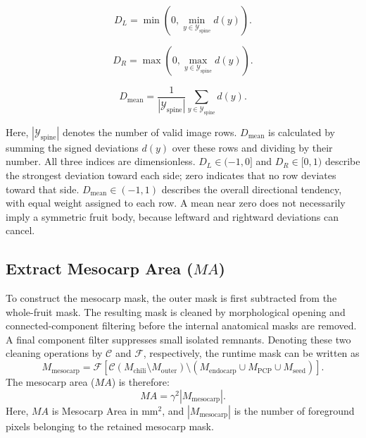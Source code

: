 \documentclass[final,5p,times,twocolumn]{elsarticle}
\begin{document}
\begin{equation}
D_L=\min\!\left(0,\min_{y\in\mathcal{Y}_{\mathrm{spine}}}d(y)\right).
\end{equation}

\begin{equation}
D_R=\max\!\left(0,\max_{y\in\mathcal{Y}_{\mathrm{spine}}}d(y)\right).
\end{equation}

\begin{equation}
D_{\mathrm{mean}}=\frac{1}{|\mathcal{Y}_{\mathrm{spine}}|}\sum_{y\in\mathcal{Y}_{\mathrm{spine}}}d(y).
\end{equation}

Here, $|\mathcal{Y}_{\mathrm{spine}}|$ denotes the number of valid image rows. $D_{\mathrm{mean}}$ is calculated by summing the signed deviations $d(y)$ over these rows and dividing by their number. All three indices are dimensionless. $D_L\in(-1,0]$ and $D_R\in[0,1)$ describe the strongest deviation toward each side; zero indicates that no row deviates toward that side. $D_{\mathrm{mean}}\in(-1,1)$ describes the overall directional tendency, with equal weight assigned to each row. A mean near zero does not necessarily imply a symmetric fruit body, because leftward and rightward deviations can cancel.

\subsection*{Extract Mesocarp Area ($MA$)}

To construct the mesocarp mask, the outer mask is first subtracted from the whole-fruit mask. The resulting mask is cleaned by morphological opening and connected-component filtering before the internal anatomical masks are removed. A final component filter suppresses small isolated remnants. Denoting these two cleaning operations by $\mathcal{C}$ and $\mathcal{F}$, respectively, the runtime mask can be written as
\begin{equation}
 M_{\mathrm{mesocarp}}=\mathcal{F}\!\left[\mathcal{C}(M_{\mathrm{chili}}\setminus M_{\mathrm{outer}})\setminus\left(M_{\mathrm{endocarp}}\cup M_{\mathrm{PCP}}\cup M_{\mathrm{seed}}\right)\right].
\end{equation}
The mesocarp area ($MA$) is therefore:
\begin{equation}
    MA=\gamma^2|M_{\mathrm{mesocarp}}|.
\end{equation}
Here, $MA$ is Mesocarp Area in mm$^2$, and $|M_{\mathrm{mesocarp}}|$ is the number of foreground pixels belonging to the retained mesocarp mask.
\end{document}

